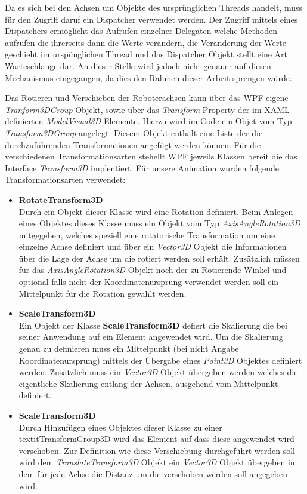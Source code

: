 Da es sich bei den Achsen um Objekte des ursprünglichen Threads handelt, muss für den Zugriff daruf ein Dispatcher verwendet werden. Der Zugriff mittels eines Dispatchers ermöglicht das Aufrufen einzelner Delegaten welche Methoden aufrufen die ihrerseits dann die Werte verändern, die Veränderung der Werte geschieht im urspünglichen Thread und das Dispatcher Objekt stellt eine Art Warteschlange dar. An dieser Stelle wird jedoch nicht genauer auf diesen Mechanismus eingegangen, da dies den Rahmen dieser Arbeit sprengen würde.

Das Rotieren und Verschieben der Roboterachsen kann über das WPF eigene \textit{Tranform3DGroup} Objekt, sowie über das \textit{Transform} Property der im XAML definierten \textit{ModelVisual3D} Elemente.
Hierzu wird im Code ein Objet vom Typ \textit{ Transform3DGroup} angelegt. Diesem Objekt enthält eine Liste der die durchzuführenden Transformationen angefügt werden können. Für die verschiedenen Transformationsarten stehellt WPF jeweils Klassen bereit die das Interface \textit{Transform3D} implentiert. Für unsere Animation wurden folgende Transformationsarten verwendet:

\begin{itemize}
\item \textbf{RotateTransform3D}\\
Durch ein Objekt dieser Klasse wird eine Rotation definiert. Beim Anlegen eines Objektes dieses Klasse muss ein Objekt vom Typ \textit{AxisAngleRotation3D} mitgegeben, welches speziell eine rotatorische Transformation um eine einzelne Achse definiert und über ein \textit{Vector3D} Objekt die Informationen über die Lage der Achse um die rotiert werden soll erhält. Zusätzlich müssen für das \textit{AxisAngleRotation3D} Objekt noch der zu Rotierende Winkel und optional falls nicht der Koordinatenursprung verwendet werden soll ein Mittelpunkt für die Rotation gewählt werden.

\item \textbf{ScaleTransform3D}\\
Ein Objekt der Klasse \textbf{ScaleTransform3D} defiert die Skalierung die bei seiner Anwendung auf ein Element angewendet wird. Um die Skalierung genau zu definieren muss ein Mittelpunkt (bei nicht Angabe Koordinatenursprung) mittels der Übergabe eines \textit{Point3D} Objektes definiert werden. Zusätzlich muss ein \textit{Vector3D} Objekt übergeben werden welches die eigentliche Skalierung entlang der Achsen, ausgehend vom Mittelpunkt definiert.

\item \textbf{ScaleTransform3D}\\
Durch Hinzufügen eines Objektes dieser Klasse zu einer \\textit{TransformGroup3D} wird das Element auf dass diese angewendet wird verschoben. Zur Definition wie diese Verschiebung durchgeführt werden soll wird dem \textit{TranslateTransform3D} Objekt ein \textit{Vector3D} Objekt übergeben in dem für jede Achse die Distanz um die verschoben werden soll angegeben wird.
\end{itemize}

